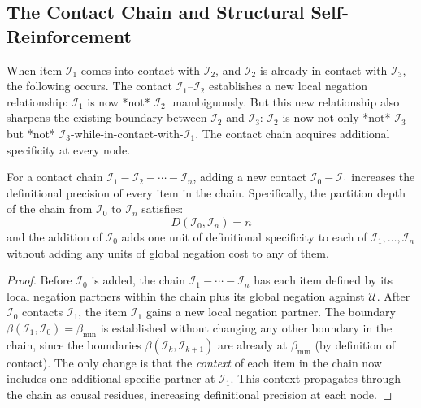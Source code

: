 \subsection{The Contact Chain and Structural Self-Reinforcement}
\label{subsec:chain}

When item $\mathcal{I}_1$ comes into contact with $\mathcal{I}_2$, and
$\mathcal{I}_2$ is already in contact with $\mathcal{I}_3$, the following
occurs. The contact $\mathcal{I}_1$--$\mathcal{I}_2$ establishes a new local
negation relationship: $\mathcal{I}_1$ is now *not* $\mathcal{I}_2$
unambiguously. But this new relationship also sharpens the existing boundary
between $\mathcal{I}_2$ and $\mathcal{I}_3$: $\mathcal{I}_2$ is now not only
*not* $\mathcal{I}_3$ but *not* $\mathcal{I}_3$-while-in-contact-with-$\mathcal{I}_1$.
The contact chain acquires additional specificity at every node.

\begin{theorem}
\label{thm:chain_reinforce}
For a contact chain $\mathcal{I}_1 - \mathcal{I}_2 - \cdots - \mathcal{I}_n$,
adding a new contact $\mathcal{I}_0 - \mathcal{I}_1$ increases the definitional
precision of every item in the chain. Specifically, the partition depth of the
chain from $\mathcal{I}_0$ to $\mathcal{I}_n$ satisfies:
\begin{equation}
    D(\mathcal{I}_0, \mathcal{I}_n) = n
    \label{eq:chain_depth}
\end{equation}
and the addition of $\mathcal{I}_0$ adds one unit of definitional specificity
to each of $\mathcal{I}_1, \ldots, \mathcal{I}_n$ without adding any units of
global negation cost to any of them.
\end{theorem}

\begin{proof}
Before $\mathcal{I}_0$ is added, the chain $\mathcal{I}_1 - \cdots -
\mathcal{I}_n$ has each item defined by its local negation partners within the
chain plus its global negation against $\mathcal{U}$. After $\mathcal{I}_0$
contacts $\mathcal{I}_1$, the item $\mathcal{I}_1$ gains a new local negation
partner. The boundary $\beta(\mathcal{I}_1, \mathcal{I}_0) = \beta_{\min}$ is
established without changing any other boundary in the chain, since the
boundaries $\beta(\mathcal{I}_k, \mathcal{I}_{k+1})$ are already at $\beta_{\min}$
(by definition of contact). The only change is that the \emph{context} of each
item in the chain now includes one additional specific partner at $\mathcal{I}_1$.
This context propagates through the chain as causal residues, increasing
definitional precision at each node.
\end{proof}

